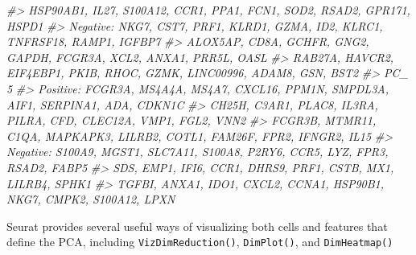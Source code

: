 \documentclass[
]{book}
\newenvironment{Shaded}{\begin{snugshade}}{\end{snugshade}}
\newcommand{\AttributeTok}[1]{\textcolor[rgb]{0.13,0.29,0.53}{#1}}
\newcommand{\CommentTok}[1]{\textcolor[rgb]{0.56,0.35,0.01}{\textit{#1}}}
\newcommand{\DecValTok}[1]{\textcolor[rgb]{0.00,0.00,0.81}{#1}}
\newcommand{\FunctionTok}[1]{\textcolor[rgb]{0.13,0.29,0.53}{\textbf{#1}}}
\newcommand{\NormalTok}[1]{#1}
\newcommand{\SpecialCharTok}[1]{\textcolor[rgb]{0.81,0.36,0.00}{\textbf{#1}}}
\newcommand{\StringTok}[1]{\textcolor[rgb]{0.31,0.60,0.02}{#1}}
\begin{document}
\begin{Shaded}
\begin{Highlighting}[]
\CommentTok{\#\textgreater{}     HSP90AB1, IL27, S100A12, CCR1, PPA1, FCN1, SOD2, RSAD2, GPR171, HSPD1 }
\CommentTok{\#\textgreater{} Negative:  NKG7, CST7, PRF1, KLRD1, GZMA, ID2, KLRC1, TNFRSF18, RAMP1, IGFBP7 }
\CommentTok{\#\textgreater{}     ALOX5AP, CD8A, GCHFR, GNG2, GAPDH, FCGR3A, XCL2, ANXA1, PRR5L, OASL }
\CommentTok{\#\textgreater{}     RAB27A, HAVCR2, EIF4EBP1, PKIB, RHOC, GZMK, LINC00996, ADAM8, GSN, BST2 }
\CommentTok{\#\textgreater{} PC\_ 5 }
\CommentTok{\#\textgreater{} Positive:  FCGR3A, MS4A4A, MS4A7, CXCL16, PPM1N, SMPDL3A, AIF1, SERPINA1, ADA, CDKN1C }
\CommentTok{\#\textgreater{}     CH25H, C3AR1, PLAC8, IL3RA, PILRA, CFD, CLEC12A, VMP1, FGL2, VNN2 }
\CommentTok{\#\textgreater{}     FCGR3B, MTMR11, C1QA, MAPKAPK3, LILRB2, COTL1, FAM26F, FPR2, IFNGR2, IL15 }
\CommentTok{\#\textgreater{} Negative:  S100A9, MGST1, SLC7A11, S100A8, P2RY6, CCR5, LYZ, FPR3, RSAD2, FABP5 }
\CommentTok{\#\textgreater{}     SDS, EMP1, IFI6, CCR1, DHRS9, PRF1, CSTB, MX1, LILRB4, SPHK1 }
\CommentTok{\#\textgreater{}     TGFBI, ANXA1, IDO1, CXCL2, CCNA1, HSP90B1, NKG7, CMPK2, S100A12, LPXN}
\end{Highlighting}
\end{Shaded}

Seurat provides several useful ways of visualizing both cells and features that define the PCA, including \texttt{VizDimReduction()}, \texttt{DimPlot()}, and \texttt{DimHeatmap()}

\begin{Shaded}
\end{Shaded}
\end{document}
